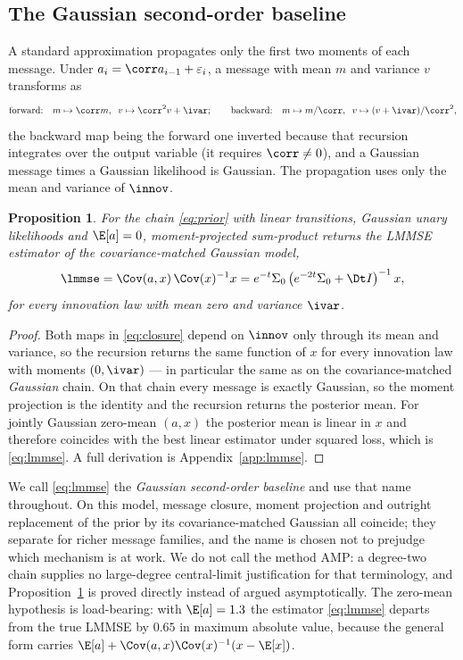 \documentclass{article}
\newtheorem{proposition}{Proposition}
\begin{document}
\subsection{The Gaussian second-order baseline}
\label{sec:closure}

A standard approximation propagates only the first two moments of each message. Under
$a_i = \corr a_{i-1} + \varepsilon_i$, a message with mean $m$ and variance $v$ transforms as
\begin{equation}
\label{eq:closure}
\text{forward:}\quad m \mapsto \corr m,\;\; v \mapsto \corr^2 v + \ivar ;
\qquad
\text{backward:}\quad m \mapsto m/\corr,\;\; v \mapsto (v+\ivar)/\corr^2 ,
\end{equation}
the backward map being the forward one inverted because that recursion integrates over the
output variable (it requires $\corr\neq0$), and a Gaussian message times a Gaussian likelihood is
Gaussian. The propagation uses only the mean and variance of $\innov$.

\begin{proposition}
\label{prop:lmmse}
For the chain \eqref{eq:prior} with linear transitions, Gaussian unary likelihoods and
$\E[a]=0$, moment-projected sum-product returns the LMMSE estimator of the covariance-matched
Gaussian model,
\begin{equation}
\label{eq:lmmse}
\lmmse
= \Cov(a,x)\,\Cov(x)^{-1} x
= e^{-t}\Sigma_0\left(e^{-2t}\Sigma_0 + \Dt I\right)^{-1} x ,
\end{equation}
for every innovation law with mean zero and variance $\ivar$.
\end{proposition}

\begin{proof}
Both maps in \eqref{eq:closure} depend on $\innov$ only through its mean and variance, so the
recursion returns the same function of $x$ for every innovation law with moments $(0,\ivar)$ ---
in particular the same as on the covariance-matched \emph{Gaussian} chain. On that chain every
message is exactly Gaussian, so the moment projection is the identity and the recursion returns
the posterior mean. For jointly Gaussian zero-mean $(a,x)$ the posterior mean is linear in $x$
and therefore coincides with the best linear estimator under squared loss, which is
\eqref{eq:lmmse}. A full derivation is Appendix~\ref{app:lmmse}.
\end{proof}

We call \eqref{eq:lmmse} the \emph{Gaussian second-order baseline} and use that name throughout.
On this model, message closure, moment projection and outright replacement of the prior by its
covariance-matched Gaussian all coincide; they separate for richer message families, and the
name is chosen not to prejudge which mechanism is at work. We do not call the method AMP:
a degree-two chain supplies no large-degree central-limit justification for that terminology, and
Proposition~\ref{prop:lmmse} is proved directly instead of argued asymptotically. The zero-mean
hypothesis is load-bearing: with $\E[a]=1.3$ the estimator \eqref{eq:lmmse} departs from the true
LMMSE by $0.65$ in maximum absolute value, because the general form carries
$\E[a] + \Cov(a,x)\Cov(x)^{-1}(x-\E[x])$.
\end{document}
